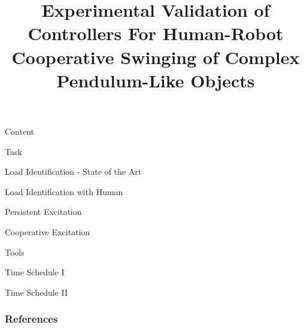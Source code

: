 \documentclass[student,noshadow]{ITRslides}
\title{Experimental Validation of Controllers For Human-Robot Cooperative Swinging of Complex Pendulum-Like Objects}
\begin{document}
\begin{frame}
    \titlepage
\end{frame}

\begin{frame}
	Content
\end{frame}

\begin{frame}
	Task
\end{frame}

\begin{frame}
	Load Identification - State of the Art
\end{frame}

\begin{frame}
	Load Identification with Human
\end{frame}

\begin{frame}
	Persistent Excitation
\end{frame}

\begin{frame}
	Cooperative Excitation
\end{frame}

\begin{frame}
	Tools
\end{frame}

\begin{frame}
	Time Schedule I
\end{frame}

\begin{frame}
	Time Schedule II
\end{frame}

\appendix
\begin{frame}
	\frametitle{References}
	\printbibliography
\end{frame}
\end{document}

